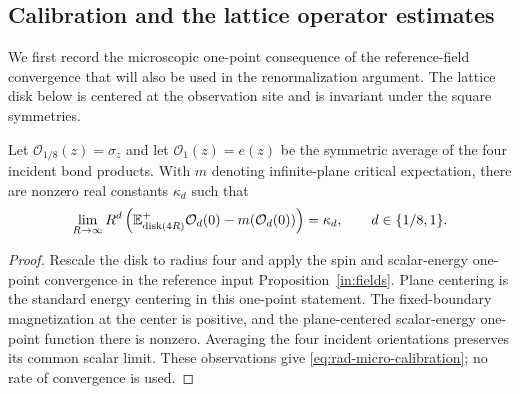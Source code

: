 \subsection{Calibration and the lattice operator estimates}

We first record the microscopic one-point consequence of the
reference-field convergence that will also be used in the
renormalization argument.  The lattice disk below is centered at
the observation site and is invariant under the square symmetries.

\begin{lemma}
\label{rad:calibration}
Let $\mathcal O_{1/8}(z)=\sigma_z$ and let
$\mathcal O_1(z)=e(z)$ be the symmetric average of the four incident
bond products.  With $m$ denoting infinite-plane critical
expectation, there are nonzero real constants $\kappa_d$ such that
\begin{equation}
 \lim_{R\to\infty}R^d\left(
       \mathbb E^+_{\mathrm{disk}(4R)}\mathcal O_d(0)
                             -m(\mathcal O_d(0))\right)=\kappa_d,
 \qquad d\in\{1/8,1\}.
 \label{eq:rad-micro-calibration}
\end{equation}
\end{lemma}

\begin{proof}
Rescale the disk to radius four and apply the spin and scalar-energy
one-point convergence in the reference input
Proposition~\ref{in:fields}.  Plane centering is the standard energy
centering in this one-point statement.  The fixed-boundary
magnetization at the center is positive, and the plane-centered
scalar-energy one-point function there is nonzero.  Averaging the
four incident orientations preserves its common scalar limit.
These observations give \eqref{eq:rad-micro-calibration}; no rate
of convergence is used.
\end{proof}

